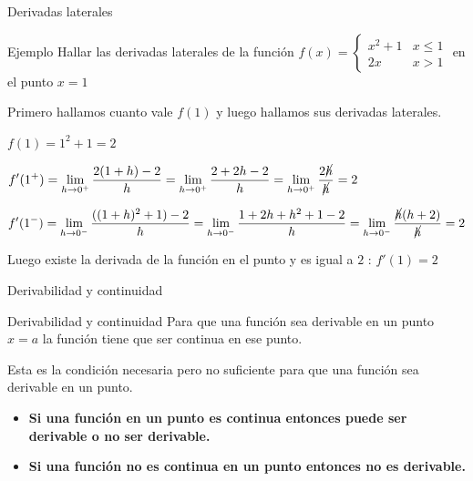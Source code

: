 \documentclass[8pt]{beamer}
\begin{document}
\begin{frame}{Derivadas laterales}
\begin{exampleblock}{Ejemplo}
Hallar las derivadas laterales de la función $f(x)=\begin{cases} x^2+1 & x \leq 1 \\ 2x & x>1 \end{cases}$ en el punto $x=1$
\end{exampleblock}
\pause
Primero hallamos cuanto vale $f(1)$ y luego hallamos sus derivadas laterales.

$f(1)=1^2+1 = 2$

\pause
$\displaystyle f'(1^+)=\lim_{h \rightarrow 0^+} \dfrac{2(1+h)-2}{h}= \lim_{h \rightarrow 0^+} \dfrac{2+2h-2}{h}=\lim_{h \rightarrow 0^+} \dfrac{2\cancel{h}}{\cancel{h}}= 2 $

\pause
$\displaystyle f'(1^-)=\lim_{h \rightarrow 0^-} \dfrac{((1+h)^2+1) -2}{h}= \lim_{h \rightarrow 0^-} \dfrac{1+2h+h^2+1-2}{h}=\lim_{h \rightarrow 0^-} \dfrac{\cancel{h}(h+2)}{\cancel{h}}= 2 $

\pause
Luego existe la derivada de la función en el punto y es igual a $2$ : $f'(1)=2$

\end{frame}

\begin{frame}{Derivabilidad y continuidad}
\begin{alertblock}{Derivabilidad y continuidad}
Para que una función sea derivable en un punto $x=a$ la función tiene que ser continua en ese punto.

Esta es la condición necesaria pero no suficiente para que una función sea derivable en un punto.
\end{alertblock}

\pause
\begin{itemize}
\item \textbf{Si una función en un punto es continua entonces puede ser derivable o no ser derivable.}
\pause
\item \textbf{Si una función no es continua en un punto entonces no es derivable.}
\end{itemize}

\end{frame}
\end{document}
